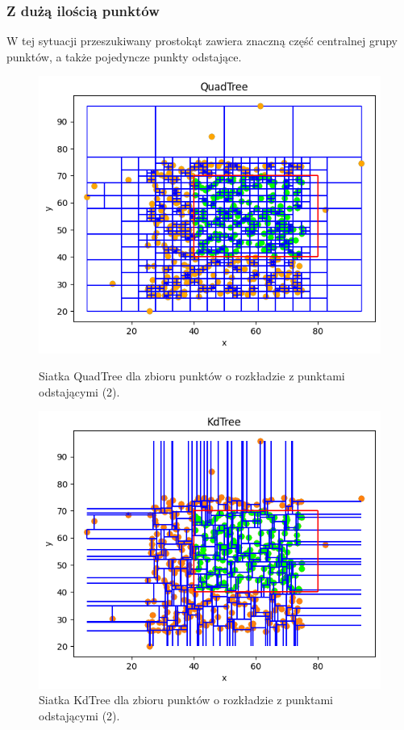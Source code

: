 \documentclass{lab}
\begin{document}
\subsubsection{Z dużą ilością punktów}
W tej sytuacji przeszukiwany prostokąt zawiera znaczną część centralnej grupy punktów, a także pojedyncze punkty odstające.

\begin{figure}[H]
  \centering
  \begin{minipage}{0.495\textwidth}
      \centering
      \includegraphics[width=1\textwidth]{resources/outlier_QuadTree_2.png}
      \caption{Siatka QuadTree dla zbioru punktów o rozkładzie z punktami odstającymi (2).}
      \label{fig:outlier_QuadTree_2}
  \end{minipage}
  \begin{minipage}{0.495\textwidth}
      \centering
      \includegraphics[width=1\textwidth]{resources/outlier_KdTree_2.png}
      \caption{Siatka KdTree dla zbioru punktów o rozkładzie z punktami odstającymi (2).}
      \label{fig:outlier_KdTree_2}
  \end{minipage}
\end{figure}
\end{document}
